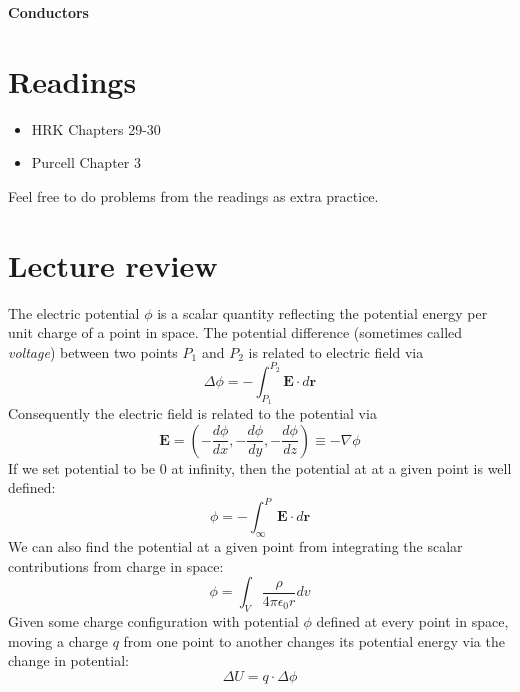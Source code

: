 \documentclass[11pt]{scrartcl}
\title{\titlee}
\author{Cambridge Physics Academy}
\date{2023-2024}
\newcommand{\titlee}{Conductors}
\begin{document}
\thispagestyle{empty}
\begin{center}
    
    
    \Huge \textbf{\textsf{\titlee}}

    \large \theauthor
\end{center}

\setcounter{section}{-1}
\section{Readings}
\begin{itemize}
    \item HRK Chapters 29-30
    \item Purcell Chapter 3
\end{itemize}
Feel free to do problems from the readings as extra practice.


\section{Lecture review}

\begin{defn}
    The electric potential $\phi$ is a scalar quantity reflecting the potential energy per unit charge of a point in space. The potential difference (sometimes called \textit{voltage}) between two points $P_1$ and $P_2$ is related to electric field via $$\Delta \phi=-\int_{P_1}^{P_2}\mathbf E\cdot d\mathbf r$$Consequently the electric field is related to the potential via $$\mathbf E=\left(-\frac{d\phi}{dx},-\frac{d\phi}{dy},-\frac{d\phi}{dz}\right)\equiv -\nabla\phi$$ If we set potential to be 0 at infinity, then the potential at at a given point is well defined: $$\phi=-\int_\infty ^{P}\mathbf E\cdot d\mathbf r$$We can also find the potential at a given point from integrating the scalar contributions from charge in space: $$\phi=\int_V\frac{\rho}{4\pi\epsilon_0 r}dv$$
    Given some charge configuration with potential $\phi$ defined at every point in space, moving a charge $q$ from one point to another changes its potential energy via the change in potential: $$\Delta U=q\cdot\Delta \phi$$
\end{defn}
\end{document}
